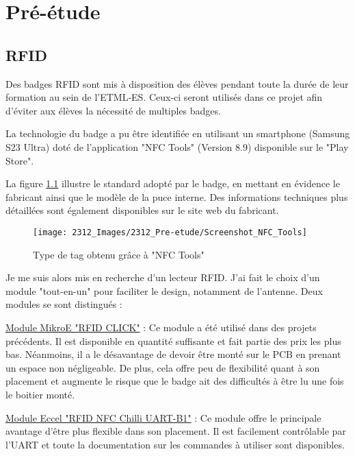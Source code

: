 \cleardoublepage
\chapter{Pré-étude}

\section{RFID}

Des badges RFID sont mis à disposition des élèves pendant toute la durée de leur formation au sein de l'ETML-ES. Ceux-ci seront utilisés dans ce projet afin d'éviter aux élèves la nécessité de multiples badges.

La technologie du badge a pu être identifiée en utilisant un smartphone (Samsung S23 Ultra) doté de l'application "NFC Tools" (Version 8.9) disponible sur le "Play Store".

La figure \ref{fig:screenshotnfctools} illustre le standard adopté par le badge, en mettant en évidence le fabricant ainsi que le modèle de la puce interne. Des informations techniques plus détaillées sont également disponibles sur le site web du fabricant. \cite{MIFAREClassicEV1}

\begin{figure}[h]
	\centering
	\texttt{[image: 2312\_Images/2312\_Pre-etude/Screenshot\_NFC\_Tools]}
	\caption{Type de tag obtenu grâce à "NFC Tools"}
	\label{fig:screenshotnfctools}
\end{figure}

Je me suis alors mis en recherche d'un lecteur RFID. J'ai fait le choix d'un module "tout-en-un" pour faciliter le design, notamment de l'antenne. Deux modules se sont distingués : 

\vspace{5pt}
\href{https://www.mikroe.com/rfid-click}{Module MikroE "RFID CLICK"} : Ce module a été utilisé dans des projets précédents. Il est disponible en quantité suffisante et fait partie des prix les plus bas. Néanmoins, il a le désavantage de devoir être monté sur le PCB en prenant un espace non négligeable. De plus, cela offre peu de flexibilité quant à son placement et augmente le risque que le badge ait des difficultés à être lu une fois le boitier monté. 

\vspace{5pt}
\href{https://www.mikroe.com/rfid-click}{Module Eccel "RFID NFC Chilli UART-B1"} : Ce module offre le principale avantage d'être plus flexible dans son placement. Il est facilement contrôlable par l'UART et toute la documentation sur les commandes à utiliser sont disponibles. 

